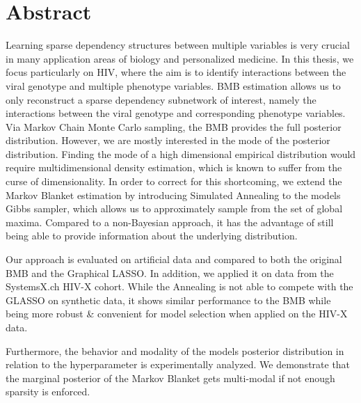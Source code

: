 \chapter{Abstract}


Learning sparse dependency structures between multiple variables is very crucial in many
application areas of biology and personalized medicine.
In this thesis, we focus particularly on HIV, where the aim is to identify interactions between the viral genotype and multiple phenotype variables.
\gls{BMB} estimation allows us to only reconstruct a sparse dependency subnetwork of interest, 
namely the interactions between the viral genotype and corresponding phenotype variables.
Via Markov Chain Monte Carlo sampling, the BMB provides the full posterior distribution.
However, we are mostly interested in the mode of the posterior distribution.
Finding the mode of a high dimensional empirical distribution would require multidimensional 
density estimation, which is known to suffer from the curse of dimensionality.
In order to correct for this shortcoming, we extend the Markov Blanket estimation by introducing Simulated Annealing to the models Gibbs sampler, which allows us to approximately sample from the set of global maxima.
Compared to a non-Bayesian approach, it has the advantage of still being able to provide information about the underlying distribution.

Our approach is evaluated on artificial data and compared to both the original BMB and the Graphical LASSO.
In addition, we applied it on data from the SystemsX.ch HIV-X cohort.
While the Annealing is not able to compete with the GLASSO on synthetic data,
it shows similar performance to the BMB while being more robust \& convenient for model selection when applied on the HIV-X data.

Furthermore, the behavior and modality of the models posterior distribution in relation to the hyperparameter is experimentally analyzed.
We demonstrate that the marginal posterior of the Markov Blanket gets multi-modal if not enough sparsity is enforced.